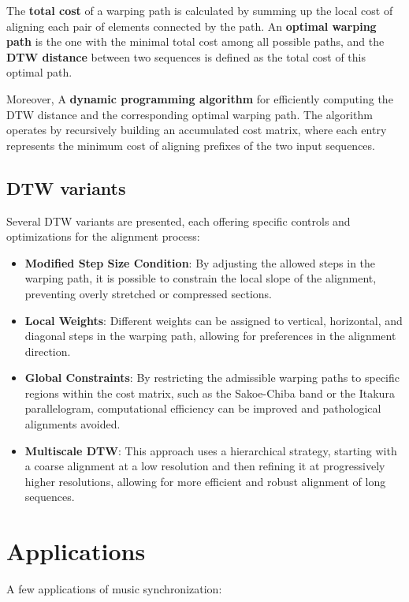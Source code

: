 \documentclass[a4paper, 9pt, twocolumn]{extarticle}
\begin{document}
    The \textbf{total cost} of a warping path is calculated by summing up
    the local cost of aligning each pair of elements connected by the path.
    An \textbf{optimal warping path} is the one with the minimal total cost
    among all possible paths, and the \textbf{DTW distance} between two
    sequences is defined as the total cost of this optimal path.
    
    Moreover, A \textbf{dynamic programming algorithm} for efficiently
    computing the DTW distance and the corresponding optimal warping path.
    The algorithm operates by recursively building an accumulated cost
    matrix, where each entry represents the minimum cost of aligning
    prefixes of the two input sequences.
    \subsection{DTW variants}
    Several DTW variants are presented, each offering specific
    controls and optimizations for the alignment process:
    
    \begin{itemize}
    \item
      \textbf{Modified Step Size Condition}: By adjusting the allowed steps
      in the warping path, it is possible to constrain the local slope of
      the alignment, preventing overly stretched or compressed sections.
    \item
      \textbf{Local Weights}: Different weights can be assigned to vertical,
      horizontal, and diagonal steps in the warping path, allowing for
      preferences in the alignment direction.
    \item
      \textbf{Global Constraints}: By restricting the admissible warping
      paths to specific regions within the cost matrix, such as the
      Sakoe-Chiba band or the Itakura parallelogram, computational
      efficiency can be improved and pathological alignments avoided.
    \item
      \textbf{Multiscale DTW}: This approach uses a hierarchical strategy,
      starting with a coarse alignment at a low resolution and then refining
      it at progressively higher resolutions, allowing for more efficient
      and robust alignment of long sequences.
    \end{itemize}
    \section{Applications}
    A few applications of music synchronization:
    
\end{document}
